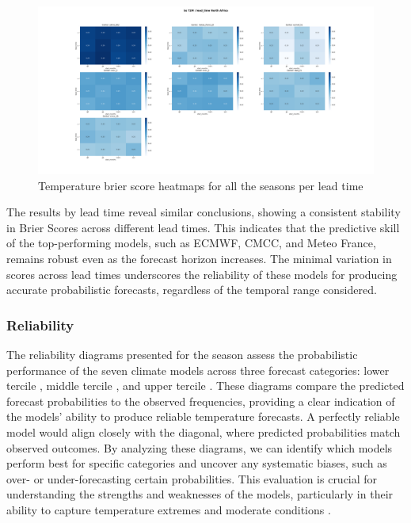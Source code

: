 \begin{figure}[H]
    \centering
    \includegraphics[width=1\linewidth]{plots/prob/bs/bs_T2M_lead_time_North_Africa.png}
    \caption{Temperature brier score heatmaps for all the seasons per lead time}
\end{figure}
The results by lead time reveal similar conclusions, showing a consistent stability in Brier Scores across different lead times. This indicates that the predictive skill of the top-performing models, such as ECMWF, CMCC, and Meteo France, remains robust even as the forecast horizon increases. The minimal variation in scores across lead times underscores the reliability of these models for producing accurate probabilistic forecasts, regardless of the temporal range considered.
\subsubsection{Reliability}
The reliability diagrams presented for the season assess the probabilistic performance of the seven climate models across three forecast categories: lower tercile , middle tercile , and upper tercile . These diagrams compare the predicted forecast probabilities to the observed frequencies, providing a clear indication of the models' ability to produce reliable temperature forecasts. A perfectly reliable model would align closely with the diagonal, where predicted probabilities match observed outcomes. By analyzing these diagrams, we can identify which models perform best for specific categories and uncover any systematic biases, such as over- or under-forecasting certain probabilities. This evaluation is crucial for understanding the strengths and weaknesses of the models, particularly in their ability to capture temperature extremes and moderate conditions .


